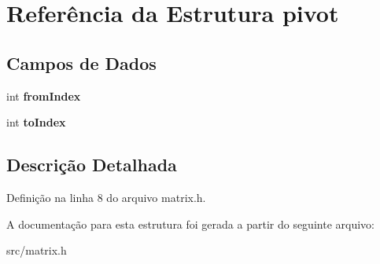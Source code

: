\hypertarget{structpivot}{}\section{Referência da Estrutura pivot}
\label{structpivot}
\subsection*{Campos de Dados}
\begin{DoxyCompactItemize}
\item 
\mbox{\label{structpivot_a08e9391c0f9f9b0bd833ddc9b6f4a7b9}} 
int {\bfseries from\+Index}
\item 
\mbox{\label{structpivot_a376d8602d9e0d832af3dd89dedf54b3a}} 
int {\bfseries to\+Index}
\end{DoxyCompactItemize}


\subsection{Descrição Detalhada}


Definição na linha 8 do arquivo matrix.\+h.



A documentação para esta estrutura foi gerada a partir do seguinte arquivo\+:\begin{DoxyCompactItemize}
\item 
src/matrix.\+h\end{DoxyCompactItemize}
